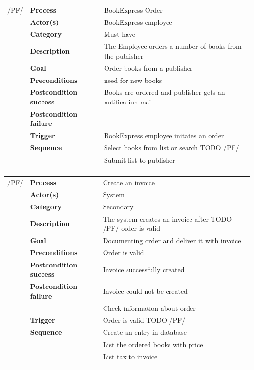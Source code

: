 \documentclass[11pt,a4paper,oneside,svgnames]{report}
\begin{document}
\noindent
\begin{tabular}{p{1.5cm}p{3cm}p{8cm}}
/PF/	& \textbf{Process} & BookExpress Order\\
		& \textbf{Actor(s)} & BookExpress employee\\
		& \textbf{Category} & Must have\\
		& \textbf{Description}	 & The Employee orders a number of books from the publisher\\
		& \textbf{Goal} & Order books from a publisher\\
		& \textbf{Preconditions} & need for new books\\
		& \textbf{Postcondition success} & Books are ordered and publisher gets an notification mail\\
		& \textbf{Postcondition failure} & -\\
		& \textbf{Trigger} & BookExpress employee initates an order\\
		& \textbf{Sequence} & Select books from list or search TODO /PF/\\
		& & Submit list to publisher\\
		
\hfill \\
\end{tabular}

\noindent
\begin{tabular}{p{1.5cm}p{3cm}p{8cm}}
/PF/	& \textbf{Process} & Create an invoice\\
		& \textbf{Actor(s)} & System\\
		& \textbf{Category} & Secondary\\
		& \textbf{Description}	 & The system creates an invoice after TODO /PF/ order is valid\\
		& \textbf{Goal} & Documenting order and deliver it with invoice\\
		& \textbf{Preconditions} & Order is valid\\
		& \textbf{Postcondition success} & Invoice successfully created\\
		& \textbf{Postcondition failure} & Invoice could not be created\\
		& & Check information about order\\
		& \textbf{Trigger} & Order is valid TODO /PF/\\
		& \textbf{Sequence} & Create an entry in database\\
		& & List the ordered books with price\\
		& & List tax to invoice\\
		
\hfill \\
\end{tabular}
\end{document}
